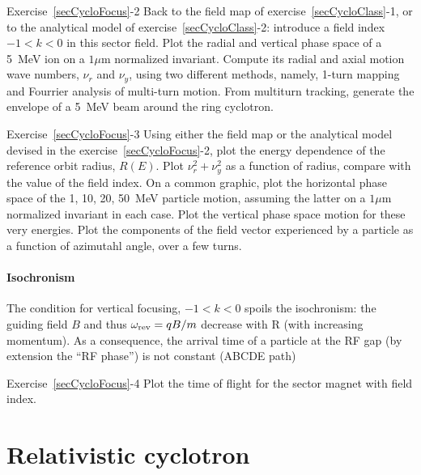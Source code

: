 \smallskip
\noindent {\small $\bullet$} Exercise~\ref{secCycloFocus}-2
Back to the field map of exercise~\ref{secCycloClass}-1, or to the analytical model 
of exercise~\ref{secCycloClass}-2: introduce a field index $-1<k<0$ in this sector field. 
Plot the radial and vertical phase space of a 5~MeV ion on a $1\mu$m normalized invariant.  
Compute its radial and axial motion wave numbers, $\nu_r$ and $\nu_y$, 
using two different methods, namely, 1-turn mapping and  Fourrier analysis of multi-turn motion. 
From multiturn tracking, generate the envelope of a 5~MeV beam around the ring cyclotron.  


\smallskip
\noindent {\small $\bullet$} Exercise~\ref{secCycloFocus}-3
Using either the field map or the analytical model devised in the  exercise~\ref{secCycloFocus}-2, 
 plot the energy dependence of the reference orbit radius, $R(E)$. 
Plot  $\nu_r^2 + \nu_y^2$ as a function of radius, compare with the value of the field index. 
On a common graphic, plot the horizontal phase space of the 1, 10, 20, 50~MeV particle motion,
assuming the latter on a $1\mu$m normalized invariant in each case.
Plot the vertical phase space motion for these very energies. 
Plot the components of the field vector experienced by a particle as a function of 
azimutahl angle, over a few turns.


\paragraph{Isochronism  \label{secCycloIsochro}}
  
The  condition  for vertical focusing, $-1 < k <0$ 
spoils the isochronism: the guiding field $B$ and thus $\omega_{\rm rev} = qB/m$ decrease with R (with increasing momentum). 
 As a consequence, the arrival time of a particle at the RF gap (by 
extension the ``RF phase'') is not constant  (ABCDE path)


\smallskip
\noindent {\small $\bullet$} Exercise~\ref{secCycloFocus}-4
Plot the time of flight for  the sector magnet with field index. 





\section{Relativistic cyclotron \label{secCycloRel}}

